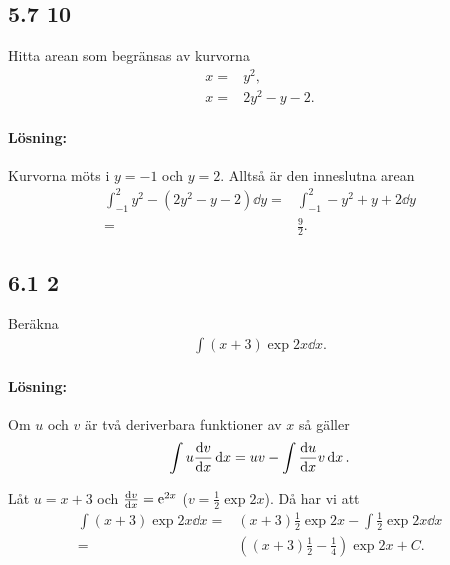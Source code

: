 \subsection{5.7 10}%
\label{sub:5_7_10}

Hitta arean som begränsas av kurvorna
\begin{align*}
	x ={}& y^2,\\
	x ={}& 2 y^2 - y - 2.
\end{align*}

\paragraph{Lösning:}

Kurvorna möts i $y = -1$ och $y = 2$.
Alltså är den inneslutna arean
\begin{align*}
	\int_{-1}^{2} y^2 - (2 y^2 - y - 2) \dd{y} ={}& \int_{-1}^{2} -y^2 + y + 2 \dd{y}\\
	={}& \frac{9}{2}.
\end{align*}


\subsection{6.1 2}%
\label{sub:6_1_2}

Beräkna
\begin{align*}
	\int (x + 3) \exp{2 x} \dd{x}.
\end{align*}

\paragraph{Lösning:}

\begin{theorem}[partialintegrering]
	Om $u$ och $v$ är två deriverbara funktioner av $x$ så gäller
	\begin{align*}
		\int u \derivative{v}{x} \dd{x} = u v - \int \derivative{u}{x} v \dd{x}.
	\end{align*}
\end{theorem}

Låt $u = x + 3$ och $\derivative{v}{x} = \exp{2 x}$ ($v = \frac{1}{2} \exp{2 x}$).
Då har vi att
\begin{align*}
	\int (x + 3) \exp{2 x} \dd{x} ={}& (x + 3) \frac{1}{2} \exp{2 x} - \int \frac{1}{2} \exp{2 x} \dd{x}\\
	={}& \left((x + 3) \frac{1}{2} - \frac{1}{4}\right) \exp{2 x} + C.
\end{align*}


